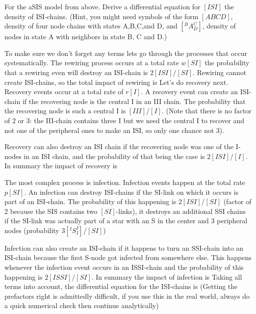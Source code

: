 For the aSIS model from above. Derive a differential equation for $[ISI]$ the density of ISI-chains. (Hint, you might need symbols of the form $[ABCD]$, density of four node chains with states A,B,C,and D, and $[^BA^C_D]$, density of nodes in state A with neighbors in state B, C and D.)  

\solution
To make sure we don't forget any terms lets go through the processes that occur systematically. The rewiring process occurs at a total rate $w[SI]$ the probability that a rewiring even will destroy an ISI-chain is $2[ISI]/[SI]$. Rewiring cannot create ISI-chains, so the total impact of rewiring is 
Let's do recovery next. Recovery events occur at a total rate of $r[I]$. A recovery event can create an ISI-chain if the recovering node is the central I in an III chain. The probability that the recovering node is such a central I is $[III]/[I]$. (Note that there is no factor of 2 or 3: the III-chain contains three I but we need the central I to recover and not one of the peripheral ones to make an ISI, so only one chance not 3). 

Recovery can also destroy an ISI chain if the recovering node was one of the I-nodes in an ISI chain, and the probability of that being the case is $2[ISI]/[I]$. In summary the impact of recovery is 

The most complex process is infection. Infection events happen at the total rate $p[SI]$. An infection can destroy ISI-chains if the SI-link on which it occurs is part of an ISI-chain. The probability of this happening is $2[ISI]/[SI]$ (factor of 2 because the SIS contains two $[SI]$-links), it destroys an additional SSI chains if the SI-link was actually part of a star with an S in the center and 3 peripheral nodes (probability $3[^IS_I^I]/[SI]$) 

Infection can also create an ISI-chain if it happens to turn an SSI-chain into an ISI-chain because the first S-node got infected from somewhere else. This happens whenever the infection event occurs in  an ISSI-chain and the probability of this happening is $2[ISSI]/[SI]$.
In summary the impact of infection is 
Taking all terms into account, the differential equation for the ISI-chains is 
(Getting the prefactors right is admittedly difficult, if you use this in the real world, always do a quick numerical check then continue analytically)
